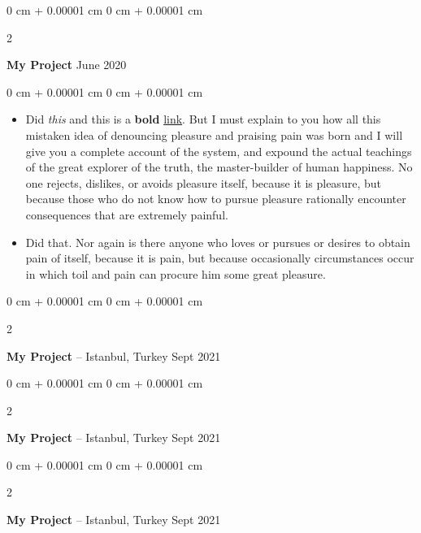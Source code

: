 \documentclass[10pt, letterpaper]{article}
\newenvironment{highlights}{
    \begin{itemize}[
        topsep=0.10 cm,
        parsep=0.10 cm,
        partopsep=0pt,
        itemsep=0pt,
        leftmargin=0 cm + 10pt
    ]
}{
    \end{itemize}
} %
\newenvironment{onecolentry}{
    \begin{adjustwidth}{
        0 cm + 0.00001 cm
    }{
        0 cm + 0.00001 cm
    }
}{
    \end{adjustwidth}
} %
\newenvironment{twocolentry}[2][]{
    \onecolentry
    \def\secondColumn{#2}
    \setcolumnwidth{\fill, 4.5 cm}
    \begin{paracol}{2}
}{
    \switchcolumn \raggedleft \secondColumn
    \end{paracol}
    \endonecolentry
} %
\begin{document}
        \vspace{0.2 cm}

        \begin{twocolentry}{
            June 2020
        }
            \textbf{My Project}\end{twocolentry}

        \vspace{0.10 cm}
        \begin{onecolentry}
            \begin{highlights}
                \item Did \textit{this} and this is a \textbf{bold} \href{https://example.com}{link}. But I must explain to you how all this mistaken idea of denouncing pleasure and praising pain was born and I will give you a complete account of the system, and expound the actual teachings of the great explorer of the truth, the master-builder of human happiness. No one rejects, dislikes, or avoids pleasure itself, because it is pleasure, but because those who do not know how to pursue pleasure rationally encounter consequences that are extremely painful.
                \item Did that. Nor again is there anyone who loves or pursues or desires to obtain pain of itself, because it is pain, but because occasionally circumstances occur in which toil and pain can procure him some great pleasure.
            \end{highlights}
        \end{onecolentry}


        \vspace{0.2 cm}

        \begin{twocolentry}{
            Sept 2021
        }
            \textbf{My Project} -- Istanbul, Turkey\end{twocolentry}



        \vspace{0.2 cm}

        \begin{twocolentry}{
            Sept 2021
        }
            \textbf{My Project} -- Istanbul, Turkey\end{twocolentry}



        \vspace{0.2 cm}

        \begin{twocolentry}{
            Sept 2021
        }
            \textbf{My Project} -- Istanbul, Turkey\end{twocolentry}
\end{document}
